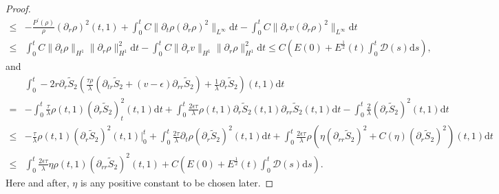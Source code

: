 \documentclass[10pt,reqno]{amsart}
\numberwithin{equation}{section}
\begin{document}
\begin{proof}
$$\begin{aligned}
			\leq&-\frac{P^{\prime}(\rho)}{\rho}(\partial_{r}\rho)^2(t,1)
			+\int_{0}^{t}C\|\partial_{t}\rho(\partial_{r}\rho)^2\|_{L^{\infty}}\mathrm{d}t
			-\int_{0}^{t}C\|\partial_{r}v(\partial_{r}\rho)^2\|_{L^{\infty}}\mathrm{d}t\\
			\leq&\int_{0}^{t}C\|\partial_{t}\rho\|_{H^{1}}\|\partial_{r}\rho\|_{H^{1}}^2\mathrm{d}t
			-\int_{0}^{t}C\|\partial_{r}v\|_{H^{1}}\|\partial_{r}\rho\|_{H^{1}}^2\mathrm{d}t
			\leq C \left(E(0)+E^{\frac{1}{2}}(t) \int_{0}^{t}\mathcal{D}(s)\mathrm{d}s\right),
		\end{aligned}
		$$
		and
		$$
		\begin{aligned}
			&\int_{0}^{t}-2r\partial_{r}\tilde{S}_2\left(\frac{\tau\rho}{\lambda}\left(\partial_{tr} \tilde{S}_2+(v-\epsilon)\partial_{rr} \tilde{S}_2\right)+\frac{1}{\lambda}\partial_{r} \tilde{S}_2\right)(t,1)\mathrm{d}t\\
			=&-\int_{0}^{t}\frac{\tau}{\lambda}\rho(t,1)(\partial_{r}\tilde{S}_2)^2_t(t,1)\mathrm{d}t
			+\int_{0}^{t}\frac{2\epsilon\tau }{\lambda}\rho(t,1)\partial_{r}\tilde{S}_2(t,1)\partial_{rr}\tilde{S}_2(t,1)\mathrm{d}t
			-\int_{0}^{t}\frac{2}{\lambda}(\partial_{r}\tilde{S}_2)^2(t,1)\mathrm{d}t\\
			\leq&-\frac{\tau}{\lambda}\rho(t,1)(\partial_{r}\tilde{S}_2)^2(t,1)\bigg|_0^t
			+\int_{0}^{t}\frac{2\tau}{\lambda}\partial_{t}\rho(\partial_{r}\tilde{S}_2)^2(t,1)\mathrm{d}t
			+\int_{0}^{t}\frac{2\epsilon\tau }{\lambda}\rho(\eta(\partial_{rr}\tilde{S}_2)^2
			+C(\eta)(\partial_{r}\tilde{S}_2)^2)(t,1)\mathrm{d}t\\
			\leq& \int_{0}^{t}\frac{2\epsilon\tau }{\lambda}\eta\rho(t,1)(\partial_{rr}\tilde{S}_2)^2(t,1)
			+C \left(E(0)+E^{\frac{1}{2}}(t) \int_{0}^{t}\mathcal{D}(s)\mathrm{d}s\right).
		\end{aligned}
		$$
		Here and after, $\eta$ is any positive constant to be chosen later.
		

\end{proof}
\end{document}
